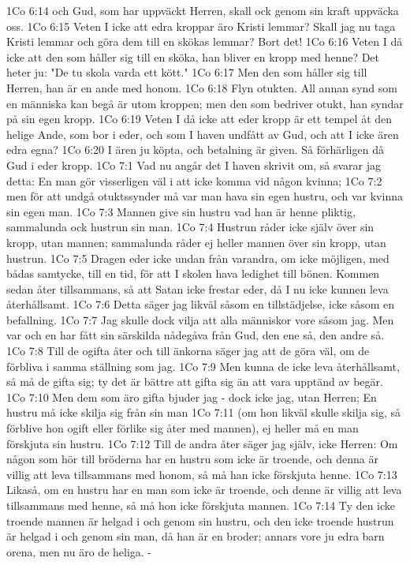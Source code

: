 1Co 6:14  och Gud, som har uppväckt Herren, skall ock genom sin kraft uppväcka oss.
1Co 6:15  Veten I icke att edra kroppar äro Kristi lemmar? Skall jag nu taga Kristi lemmar och göra dem till en skökas lemmar? Bort det!
1Co 6:16  Veten I då icke att den som håller sig till en sköka, han bliver en kropp med henne? Det heter ju: "De tu skola varda ett kött."
1Co 6:17  Men den som håller sig till Herren, han är en ande med honom.
1Co 6:18  Flyn otukten. All annan synd som en människa kan begå är utom kroppen; men den som bedriver otukt, han syndar på sin egen kropp.
1Co 6:19  Veten I då icke att eder kropp är ett tempel åt den helige Ande, som bor i eder, och som I haven undfått av Gud, och att I icke ären edra egna?
1Co 6:20  I ären ju köpta, och betalning är given. Så förhärligen då Gud i eder kropp.
1Co 7:1  Vad nu angår det I haven skrivit om, så svarar jag detta: En man gör visserligen väl i att icke komma vid någon kvinna;
1Co 7:2  men för att undgå otuktssynder må var man hava sin egen hustru, och var kvinna sin egen man.
1Co 7:3  Mannen give sin hustru vad han är henne pliktig, sammalunda ock hustrun sin man.
1Co 7:4  Hustrun råder icke själv över sin kropp, utan mannen; sammalunda råder ej heller mannen över sin kropp, utan hustrun.
1Co 7:5  Dragen eder icke undan från varandra, om icke möjligen, med bådas samtycke, till en tid, för att I skolen hava ledighet till bönen. Kommen sedan åter tillsammans, så att Satan icke frestar eder, då I nu icke kunnen leva återhållsamt.
1Co 7:6  Detta säger jag likväl såsom en tillstädjelse, icke såsom en befallning.
1Co 7:7  Jag skulle dock vilja att alla människor vore såsom jag. Men var och en har fått sin särskilda nådegåva från Gud, den ene så, den andre så.
1Co 7:8  Till de ogifta åter och till änkorna säger jag att de göra väl, om de förbliva i samma ställning som jag.
1Co 7:9  Men kunna de icke leva återhållsamt, så må de gifta sig; ty det är bättre att gifta sig än att vara upptänd av begär.
1Co 7:10  Men dem som äro gifta bjuder jag - dock icke jag, utan Herren; En hustru må icke skilja sig från sin man
1Co 7:11  (om hon likväl skulle skilja sig, så förblive hon ogift eller förlike sig åter med mannen), ej heller må en man förskjuta sin hustru.
1Co 7:12  Till de andra åter säger jag själv, icke Herren: Om någon som hör till bröderna har en hustru som icke är troende, och denna är villig att leva tillsammans med honom, så må han icke förskjuta henne.
1Co 7:13  Likaså, om en hustru har en man som icke är troende, och denne är villig att leva tillsammans med henne, så må hon icke förskjuta mannen.
1Co 7:14  Ty den icke troende mannen är helgad i och genom sin hustru, och den icke troende hustrun är helgad i och genom sin man, då han är en broder; annars vore ju edra barn orena, men nu äro de heliga. -
